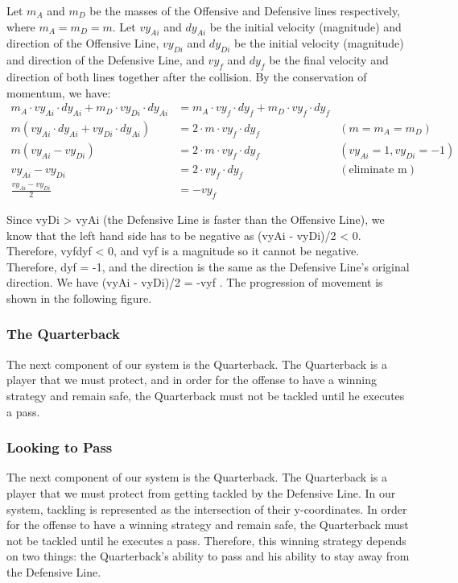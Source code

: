 Let $m_A$ and $m_D$ be the masses of the Offensive and Defensive lines respectively, where $m_A = m_D = m$. Let $vy_{Ai}$ and $dy_{Ai}$ be the initial velocity (magnitude) and direction of the Offensive Line, $vy_{Di}$ and $dy_{Di}$ be the initial velocity (magnitude) and direction of the Defensive Line, and $vy_f$ and $dy_f$ be the final velocity and direction of both lines together after the collision. By the conservation of momentum, we have:
\begin{align*}
m_A \cdot vy_{Ai} \cdot dy_{Ai} + m_D \cdot vy_{Di} \cdot dy_{Ai} &= m_A \cdot vy_f \cdot dy_f + m_D \cdot vy_f \cdot dy_f \\
m(vy_{Ai} \cdot dy_{Ai} + vy_{Di} \cdot dy_{Ai}) &= 2 \cdot m \cdot vy_f \cdot dy_f & (m = m_A = m_D) \\
m(vy_{Ai} - vy_{Di}) &= 2 \cdot m \cdot vy_f \cdot dy_f & (vy_{Ai} = 1, vy_{Di} = -1) \\
vy_{Ai} - vy_{Di} &= 2 \cdot vy_f \cdot dy_f & (\text{eliminate m}) \\
\frac{vy_{Ai} - vy_{Di}}{2} &= -vy_f
\end{align*}

Since vyDi > vyAi (the Defensive Line is faster than the Offensive Line), we know that the left hand side has to be negative as (vyAi - vyDi)/2 < 0. Therefore, vyfdyf < 0, and vyf is a magnitude so it cannot be negative. Therefore, dyf = -1, and the direction is the same as the Defensive Line’s original direction. We have (vyAi - vyDi)/2 = -vyf . The progression of movement is shown in the following figure.

\subsubsection{The Quarterback}
\quad The next component of our system is the Quarterback. The Quarterback is a player that we must protect, and in order for the offense to have a winning strategy and remain safe, the Quarterback must not be tackled until he executes a pass. 

\subsubsection{Looking to Pass}

\quad The next component of our system is the Quarterback. The Quarterback is a player that we must protect from getting tackled by the Defensive Line. In our system, tackling is represented as the intersection of their y-coordinates. In order for the offense to have a winning strategy and remain safe, the Quarterback must not be tackled until he executes a pass. Therefore, this winning strategy depends on two things: the Quarterback’s ability to pass and his ability to stay away from the Defensive Line. 

